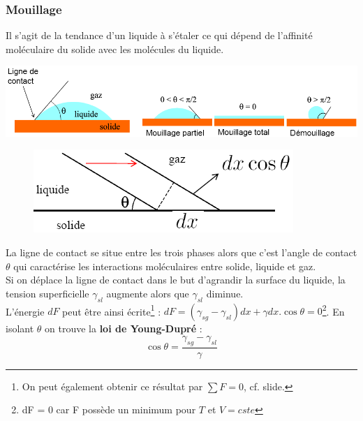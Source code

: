 \documentclass[11pt, a4paper, openany]{book}
\begin{document}
\subsubsection{Mouillage}
Il s'agit de la tendance d'un liquide à s'étaler ce qui dépend de l'affinité moléculaire du solide avec les molécules du liquide. 
\begin{center}
\includegraphics[scale=0.5]{cp/image14.png}
\end{center}
\begin{figure}
\includegraphics[scale=0.4]{cp/image15.png}
\end{figure}
La ligne de contact se situe entre les trois phases alors que c'est l'angle de contact $\theta$ qui caractérise les interactions moléculaires entre solide, liquide et gaz.\\

Si on déplace la ligne de contact dans le but d'agrandir la surface du liquide, la tension superficielle $\gamma_{sl}$ augmente alors que $\gamma_{sl}$ diminue.\\
L'énergie $dF$ peut être ainsi écrite\footnote{On peut également obtenir ce résultat par $\sum F = 0$, cf. slide.} : $dF = (\gamma_{sg} - \gamma_{sl})dx + \gamma dx.\cos\theta = 0$\footnote{dF = 0 car F possède un minimum pour $T$ et $V = cste$}. En isolant $\theta$ on trouve la \textbf{loi de Young-Dupré} :
\begin{equation}
\cos\theta = \frac{\gamma_{sg} - \gamma_{sl}}{\gamma}
\end{equation}

\newpage
\end{document}
